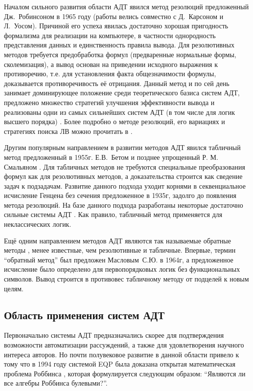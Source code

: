 Началом сильного развития области АДТ явился метод резолюций \cite{Robinson_1965} предложенный Дж.~Робинсоном в 1965 году (работы велись совместно с Д.~Карсоном и Л.~Уосом). Причиной его успеха явилась достаточно хорошая пригодность формализма для реализации на компьютере, в частности однородность представления данных и единственность правила вывода. Для резолютивных методов требуется предобработка формул (предваренные нормальные формы, сколемизация), а вывод основан на приведении исходного выражения к противоречию, т.е. для установления факта общезначимости формулы, доказывается противоречивость её отрицания. Данный метод и по сей день занимает доминирующее положение среди теоретического базиса систем АДТ, предложено множество стратегий улучшения эффективности вывода и реализованы одни из самых сильнейших систем АДТ (в том числе для логик высшего порядка) \cite{otter, vprover, eprover, iprover, leoprover}. Более подробно о методе резолюций, его вариациях и стратегиях поиска ЛВ можно прочитать в \cite{HAR, ChenLi}.

Другим популярным направлением в развитии методов АДТ явился табличный метод \cite{tableau2} предложенный в 1955г. Е.В.~Бетом \cite{Beth1955} и позднее упрощенный Р. М. Смальяном \cite{Smullyan1995}. Для табличных методов не требуются специальные преобразования формул как для резолютивных методов, а доказательства строится как сведение задач к подзадачам.  Развитие данного подхода уходит корнями в секвенциальное исчисление Генцена без сечения \cite{gentzen1935} предложенное в 1935г, задолго до появления метода резолюций. На базе данного подхода разработаны некоторые достаточно сильные системы АДТ \cite{Isabelle, leancop}. Как правило, табличный метод применяется для неклассических логик.

Ещё одним направлением методов АДТ являются так называемые обратные методы \cite{inverse}, менее известные, чем резолютивные и табличные. Впервые, термин ``обратный метод'' был предложен Масловым~С.Ю. \cite{Maslov_1964} в 1964г, а предложенное исчисление было определено для первопорядковых логик без функциональных символов. Вывод строится в противовес табличному методу от подцелей к новым целям. 


\subsection{Область применения систем АДТ}
Первоначально системы АДТ предназначались скорее для подтверждения возможности автоматизации рассуждений, а также для удовлетворения научного интереса авторов. Но почти полувековое развитие в данной области привело к тому что в 1994 году системой EQP была доказана открытая математическая проблема Роббинса \cite{McCuneRob}, которая формулируется следующим образом: ``Являются ли все алгебры Роббинса булевыми?''.

